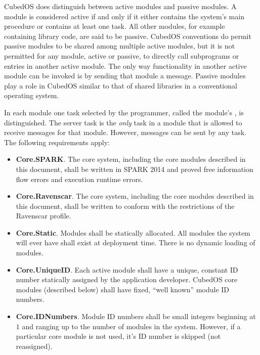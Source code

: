 CubedOS does distinguish between active modules and passive modules. A module is considered
active if and only if it either contains the system's main procedure or contains at least one
task. All other modules, for example containing library code, are said to be passive. CubedOS
conventions do permit passive modules to be shared among multiple active modules, but it is not
permitted for any module, active or passive, to directly call subprograms or entries in another
active module.  The only way functionality in
another active module can be invoked is by sending that module a message. Passive modules play a
role in CubedOS similar to that of shared libraries in a conventional operating system.

In each module one task selected by the programmer, called the module's ,
is distinguished. The server task is the \emph{only} task in a module that is allowed to receive
messages for that module. However, messages can be sent by any task. The following requirements
apply:

\begin{itemize}
\item \textbf{Core.SPARK}. The core system, including the core modules described in this
  document, shall be written in SPARK 2014 and proved free information flow errors and execution
  runtime errors.
\item \textbf{Core.Ravenscar}. The core system, including the core modules described in this
  document, shall be written to conform with the restrictions of the Ravenscar profile.
\item \textbf{Core.Static}. Modules shall be statically allocated. All modules the system will
  ever have shall exist at deployment time. There is no dynamic loading of modules. 
\item \textbf{Core.UniqueID}. Each active module shall have a unique, constant ID number
  statically assigned by the application developer. CubedOS core modules (described below) shall
  have fixed, ``well known'' module ID numbers.
\item \textbf{Core.IDNumbers}. Module ID numbers shall be small integers beginning at $1$ and
  ranging up to the number of modules in the system. However, if a particular core module is not
  used, it's ID number is skipped (not reassigned).
\end{itemize}

